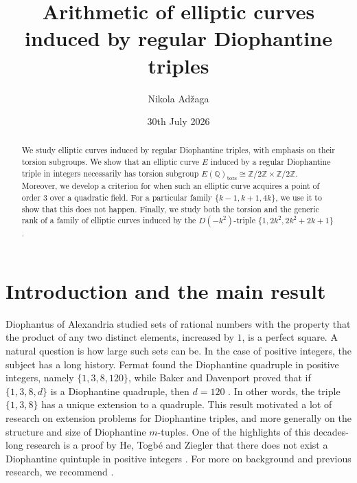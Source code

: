 \documentclass{article}
\title{\Large Arithmetic of elliptic curves induced by regular Diophantine triples}
\author{Nikola Ad\v zaga}
\date{30th July 2026}
\theoremstyle{plain}
\newcommand{\Z}{\mathbb{Z}}
\newcommand{\Q}{\mathbb{Q}}
\newcommand{\tors}{\mathrm{tors}}
\begin{document}
\maketitle
\begingroup
\renewcommand{\thefootnote}{}
\addtocounter{footnote}{-1}
\endgroup

\begin{abstract}
    We study elliptic curves induced by regular Diophantine triples, with emphasis on their torsion subgroups. We show that an elliptic curve \(E\) induced by a regular Diophantine triple in integers necessarily has torsion subgroup \(E(\Q)_\tors \cong \Z/2\Z \times \Z/2\Z\). Moreover, we develop a criterion for when such an elliptic curve acquires a point of order \(3\) over a quadratic field. For a particular family \(\{ k-1, k+1, 4k\}\), we use it to show that this does not happen. Finally, we study both the torsion and the generic rank of a family of elliptic curves induced by the \(D(-k^2)\)-triple \(\{1, 2k^2, 2k^2+2k+1\}\).\\
\end{abstract}


\section{Introduction and the main result}

Diophantus of Alexandria studied sets of rational numbers with the property that the product of any two distinct elements, increased by \(1\), is a perfect square. 
A natural question is how large such sets can be. 
In the case of positive integers, the subject has a long history. 
Fermat found the Diophantine quadruple in positive integers, namely \(\{1,3,8,120\}\), 
while Baker and Davenport proved that if \(\{1,3,8,d\}\) is a Diophantine quadruple, then \(d=120\) \cite{BaDa}. 
In other words, the triple \(\{1,3,8\}\) has a unique extension to a quadruple. 
This result motivated a lot of research on extension problems for Diophantine triples, and more generally on the structure and size of Diophantine \(m\)-tuples. One of the highlights of this decades-long research is a proof by He, Togb\'e and Ziegler that there does not exist a Diophantine quintuple in positive integers \cite{HeToZi}. For more on background and previous research, we recommend \cite{DujeBook,DujeWeb}.
\end{document}
